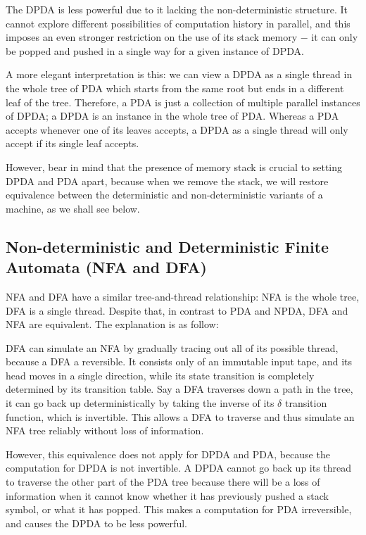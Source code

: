 \documentclass[12pt]{article}  %
\begin{document}
The DPDA is less powerful due to it lacking the non-deterministic structure. It cannot explore different possibilities of computation history in parallel, and this imposes an even stronger restriction on the use of its stack memory $-$ it can only be popped and pushed in a single way for a given instance of DPDA. 

A more elegant interpretation is this: we can view a DPDA as a single thread in the whole tree of PDA which starts from the same root but ends in a different leaf of the tree. Therefore, a PDA is just a collection of multiple parallel instances of DPDA; a DPDA is an instance in the whole tree of PDA. Whereas a PDA accepts whenever one of its leaves accepts, a DPDA as a single thread will only accept if its single leaf accepts. 

However, bear in mind that the presence of memory stack is crucial to setting DPDA and PDA apart, because when we remove the stack, we will restore equivalence between the deterministic and non-deterministic variants of a machine, as we shall see below.



\subsection{Non-deterministic and Deterministic Finite Automata (NFA and DFA)}

NFA and DFA have a similar tree-and-thread relationship: NFA is the whole tree, DFA is a single thread. Despite that, in contrast to PDA and NPDA, DFA and NFA are equivalent. The explanation is as follow:

DFA can simulate an NFA by gradually tracing out all of its possible thread, because a DFA a reversible. It consists only of an immutable input tape, and its head moves in a single direction, while its state transition is completely determined by its transition table. Say a DFA traverses down a path in the tree, it can go back up deterministically by taking the inverse of its $\delta$ transition function, which is invertible. This allows a DFA to traverse and thus simulate an NFA tree reliably without loss of information.

However, this equivalence does not apply for DPDA and PDA, because the computation for DPDA is not invertible. A DPDA cannot go back up its thread to traverse the other part of the PDA tree because there will be a loss of information when it cannot know whether it has previously pushed a stack symbol, or what it has popped. This makes a computation for PDA irreversible, and causes the DPDA to be less powerful.
\end{document}
